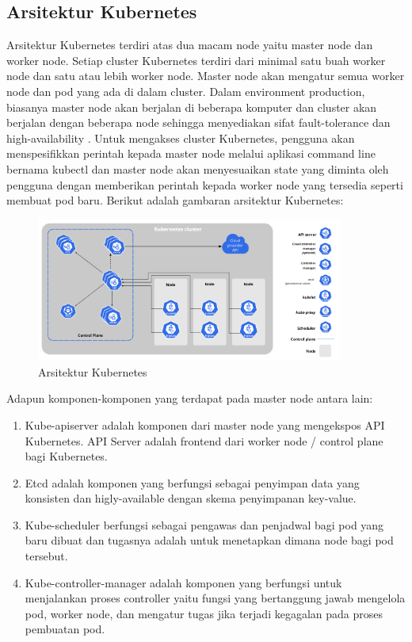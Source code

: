 \subsection{Arsitektur Kubernetes}
Arsitektur Kubernetes terdiri atas dua macam node yaitu master node dan worker node.
Setiap cluster Kubernetes terdiri dari minimal satu buah worker node dan satu atau lebih worker node.
Master node akan mengatur semua worker node dan pod yang ada di dalam cluster.
Dalam environment production, biasanya master node akan berjalan di beberapa komputer dan cluster akan berjalan dengan beberapa node sehingga menyediakan sifat fault-tolerance dan high-availability \citep{kube-arch}.
Untuk mengakses cluster Kubernetes, pengguna akan menspesifikkan perintah kepada master node melalui aplikasi command line bernama kubectl dan master node akan menyesuaikan state yang diminta oleh pengguna dengan memberikan perintah kepada worker node yang tersedia seperti membuat pod baru.
Berikut adalah gambaran arsitektur Kubernetes:
\begin{figure}[htb]
      \centering
      \includegraphics[width=0.9\textwidth]{resources/ch2/kube-1.png}
      \caption{Arsitektur Kubernetes \citep{kube-arch}}
      \label{KubeArch}
\end{figure}

Adapun komponen-komponen yang terdapat pada master node antara lain:
\begin{enumerate}
      \item Kube-apiserver adalah komponen dari master node yang mengekspos API Kubernetes. API Server adalah frontend dari worker node / control plane bagi Kubernetes.
      \item Etcd adalah komponen yang berfungsi sebagai penyimpan data yang konsisten dan higly-available dengan skema penyimpanan key-value.
      \item	Kube-scheduler berfungsi sebagai pengawas dan penjadwal bagi pod yang baru dibuat dan tugasnya adalah untuk menetapkan dimana node  bagi pod tersebut.
      \item	Kube-controller-manager adalah komponen yang berfungsi untuk menjalankan proses controller yaitu fungsi yang bertanggung jawab mengelola pod, worker node, dan mengatur tugas jika terjadi kegagalan pada proses pembuatan pod.
\end{enumerate}


